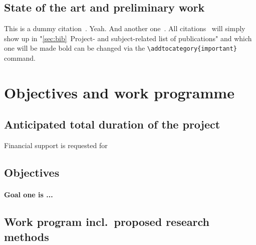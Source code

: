 \documentclass{scrartcl}
\begin{document}
\subsection*{State of the art and preliminary work}

This is a dummy citation~\cite{lamkiewicz2024ribap}. Yeah. And another one~\cite{assmann2025augmentation}. All citations~\cite{fuchs2025varvamp,galeone2025decoding,raharinirina2025sars} will simply show up in "\ref{sec:bib}~Project- and subject-related list of publications" and which one will be made bold can be changed via the \verb=\addtocategory{important}= command.

\lipsum[1]

\section{Objectives and work programme}

\subsection{Anticipated total duration of the project}
Financial support is requested for 

\subsection{Objectives}
\let\oldpara=\theparagraph
\addtocounter{secnumdepth}{1}
\renewcommand{\theparagraph}{Goal \arabic{paragraph}}

\paragraph{\textnormal{Goal one is ...}}

\subsection{Work program incl.\ proposed research methods}
\end{document}
